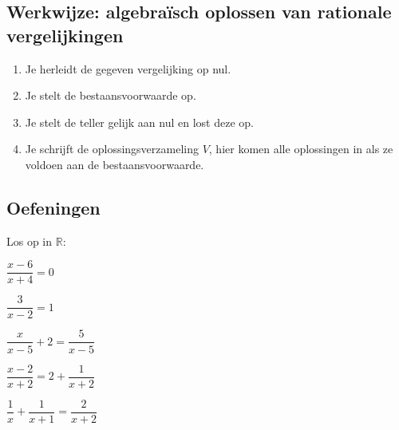 \documentclass[12pt,twoside,a4paper]{article}
\begin{document}
\subsection{Werkwijze: algebraïsch oplossen van rationale vergelijkingen}
\begin{enumerate}[(1)]
\item Je herleidt de gegeven vergelijking op nul.
\item Je stelt de bestaansvoorwaarde op.
\item Je stelt de teller gelijk aan nul en lost deze op.
\item Je schrijft de oplossingsverzameling $V$, hier komen alle oplossingen in als ze voldoen aan de bestaansvoorwaarde.
\end{enumerate}

\subsection{Oefeningen}

\begin{oefening} %
Los op in $\mathbb{R}$:
\begin{exlist}{2}
\item $\dfrac{x-6}{x+4}=0$
\item $\dfrac{3}{x-2}=1$
\item $\dfrac{x}{x-5}+2=\dfrac{5}{x-5}$
\item $\dfrac{x-2}{x+2}=2+\dfrac{1}{x+2}$
\item $\dfrac{1}{x}+\dfrac{1}{x+1}=\dfrac{2}{x+2}$
\end{exlist}
\end{oefening}
\end{document}
